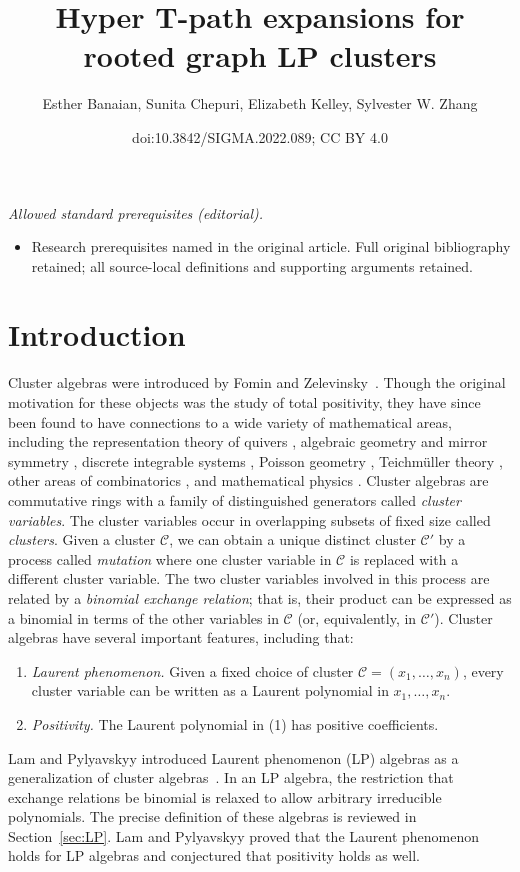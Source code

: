 \documentclass[10pt,a4paper]{amsart}
\title{Hyper T-path expansions for rooted graph LP clusters}
\author{Esther Banaian, Sunita Chepuri, Elizabeth Kelley, Sylvester W. Zhang}
\date{doi:10.3842/SIGMA.2022.089; CC BY 4.0}
\numberwithin{equation}{section}
\newcommand{\calC}{\mathcal{C}}
\begin{document}
\maketitle
\noindent\textit{Allowed standard prerequisites (editorial).}\begin{itemize}
\item Research prerequisites named in the original article. Full original bibliography retained; all source-local definitions and supporting arguments retained.
\end{itemize}\medskip
\section{Introduction}\label{sec:intro}
Cluster algebras were introduced by Fomin and Zelevinsky~\cite{FZ-02}. Though the original motivation for these objects was the study of total positivity, they have since been found to have connections to a wide variety of mathematical areas, including the representation theory of quivers \cite{BMRRT-06, K-10, R-10}, algebraic geometry and mirror symmetry \cite{B-17,GHK-15}, discrete integrable systems \cite{FH-13, K-10-II}, Poisson geometry \cite{GSV-05,GSV-10}, Teichm\"uller theory \cite{FG-09, FG-10, FT-18, GSV-05}, other areas of combinatorics \cite{BMDKTY-18,C-04, CFZ-02,IT-09}, and mathematical physics \cite{C-04,F-12}.
Cluster algebras are commutative rings with a family of distinguished generators called \emph{cluster variables}. The cluster variables occur in overlapping subsets of fixed size called \emph{clusters}. Given a cluster $\calC$, we can obtain a unique distinct cluster $\calC'$ by a process called \emph{mutation} where one cluster variable in $\calC$ is replaced with a different cluster variable. The two cluster variables involved in this process are related by a \emph{binomial exchange relation}; that is, their product can be expressed as a binomial in terms of the other variables in $\calC$ (or, equivalently, in $\calC'$).
Cluster algebras have several important features, including that:
\begin{enumerate}\itemsep=0pt
 \item[(1)] \emph{Laurent phenomenon.} Given a fixed choice of cluster $\calC=(x_1,\dots,x_n)$, every cluster vari\-able can be written as a Laurent polynomial in $x_1,\dots,x_n$.
 \item[(2)] \emph{Positivity.} The Laurent polynomial in (1) has positive coefficients.
\end{enumerate}
Lam and Pylyavskyy introduced Laurent phenomenon (LP) algebras as a generalization of cluster algebras~\cite{LP-12}. In an LP algebra, the restriction that exchange relations be binomial is relaxed to allow arbitrary irreducible polynomials. The precise definition of these algebras is reviewed in Section~\ref{sec:LP}. Lam and Pylyavskyy proved that the Laurent phenomenon holds for LP algebras and conjectured that positivity holds as well.
\end{document}
